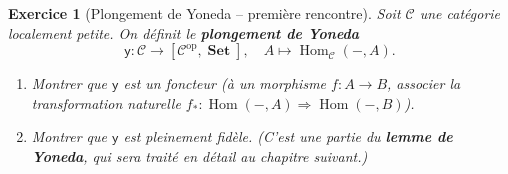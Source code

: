 \documentclass[a4paper,12pt]{book}
\DeclareMathOperator{\Hom}{Hom}
\DeclareMathOperator{\Set}{\mathbf{Set}}
\newcommand{\op}{\mathrm{op}}
\newtheorem{exercice}{Exercice}[chapter]
\begin{document}
\begin{exercice}[Plongement de Yoneda -- première rencontre]\label{exo:yoneda-intro}
Soit $\mathcal{C}$ une catégorie localement petite. On définit le \textbf{plongement de Yoneda}
\[
  \mathsf{y} : \mathcal{C} \longrightarrow [\mathcal{C}^{\op}, \Set], \quad A \longmapsto \Hom_\mathcal{C}(-, A).
\]
\begin{enumerate}[label=(\alph*)]
  \item Montrer que $\mathsf{y}$ est un foncteur (à un morphisme $f : A \to B$, associer la transformation naturelle $f_* : \Hom(-, A) \Rightarrow \Hom(-, B)$).
  \item Montrer que $\mathsf{y}$ est pleinement fidèle. (C'est une partie du \textbf{lemme de Yoneda}, qui sera traité en détail au chapitre suivant.)
\end{enumerate}
\end{exercice}
\end{document}
